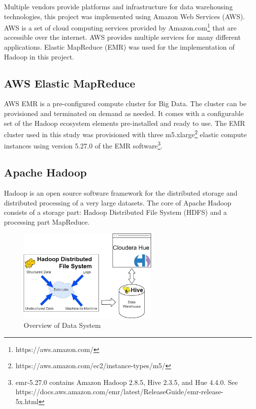 \documentclass[journal]{IEEEtran}
\begin{document}
Multiple vendors provide platforms and infrastructure for data warehousing technologies, 
 this project was implemented using Amazon Web Services (AWS).
AWS is a set of cloud computing services provided by Amazon.com\footnote{https://aws.amazon.com/}
 that are accessible over the internet.
AWS provides multiple services for many different applications. 
Elastic MapReduce (EMR) was used for the implementation of Hadoop in this project.

\subsection{AWS Elastic MapReduce}

AWS EMR is a pre-configured compute cluster for Big Data.
The cluster can be provisioned and terminated on demand as needed.
It comes with a configurable set of the Hadoop ecosystem elements pre-installed and ready to use.
The EMR cluster used in this study was provisioned with three
 m5.xlarge\footnote{https://aws.amazon.com/ec2/instance-types/m5/}
 elastic compute instances using version 5.27.0 of the EMR 
 software\footnote{emr-5.27.0 contains Amazon Hadoop 2.8.5, Hive 2.3.5, and Hue 4.4.0. See https://docs.aws.amazon.com/emr/latest/ReleaseGuide/emr-release-5x.html}.

\subsection{Apache Hadoop}

Hadoop is an open source software framework for the distributed storage and
 distributed processing of a very large datasets. 
The core of Apache Hadoop consists of a storage part: Hadoop Distributed File System
 (HDFS) and a processing part MapReduce.

\begin{figure}
	\centering
	\includegraphics[width=2.7in]{system_overview_final.png}
	\caption{Overview of Data System}
	\label{system_overview_final}
\end{figure}
\end{document}
